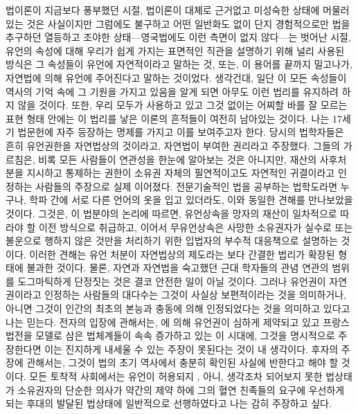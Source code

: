 법이론이 지금보다 풍부했던 시절,
법이론이 대체로 근거없고 미성숙한 상태에 머물러 있는 것은 사실이지만
그럼에도 불구하고 어떤 일반화도 없이 단지
경험적으로만 법을 추구하던 열등하고 조야한
상태---영국법에도 이런 측면이 없지 않다---는 벗어난 시절,
유언의 속성에 대해 우리가 쉽게 가지는 표면적인 직관을 설명하기 위해
널리 사용된 방식은
그 속성들이 유언에 자연적이라고 말하는 것,
또는, 이 용어를 끝까지 밀고나가,
자연법에 의해 유언에 주어진다고 말하는 것이었다.
생각건대,
일단 이 모든 속성들이
역사의 기억 속에 그 기원을 가지고 있음을 알게 되면
아무도 이런 법리를 유지하려 하지 않을 것이다.
또한,
우리 모두가 사용하고 있고
그것 없이는 어찌할 바를 잘 모르는 표현 형태 안에는
이 법리를 낳은 이론의 흔적들이
여전히 남아있는 것이다.
나는 17세기 법문헌에 자주 등장하는 명제를 가지고 이를 보여주고자 한다.
당시의 법학자들은 흔히 유언권한을 자연법상의 것이라고,
자연법이 부여한 권리라고 주장했다.
그들의 가르침은,
비록 모든 사람들이 연관성을 한눈에 알아보는 것은 아니지만,
재산의 사후처분을 지시하고 통제하는 권한이
소유권 자체의 필연적이고도 자연적인 귀결이라고
인정하는 사람들의 주장으로 실제 이어졌다.
전문기술적인 법을 공부하는 법학도라면 누구나,
학파 간에 서로 다른 언어의 옷을 입고 있더라도,
이와 동일한 견해를 만나보았을 것이다.
그것은, 이 법분야의 논리에 따르면,
%
유언상속을
망자의 재산이 일차적으로 따라야 할 이전 방식으로 취급하고,
%
이어서 무유언상속은
사망한 소유권자가 실수로 또는 불운으로
행하지 않은 것만을 처리하기 위한 입법자의 부수적 대응책으로
설명하는 것이다.
이러한 견해는 유언 처분이 자연법상의 제도라는 보다 간결한 법리가 확장된
형태에 불과한 것이다.
물론, 자연과 자연법을 숙고했던 근대 학자들의 관념 연관의 범위를
도그마틱하게 단정짓는 것은 결코 안전한 일이 아닐 것이다.
그러나 유언권이 자연권이라고 인정하는 사람들의 대다수는
그것이 사실상 보편적이라는 것을 의미하거나, 아니면
그것이 인간의 최초의 본능과 충동에 의해 인정되었다는 것을 의미하고 있다고
나는 믿는다.
전자의 입장에 관해서는,
에 의해 유언권이 심하게 제약되고 있고
프랑스 법전을 모델로 삼은 법체계들이 속속 증가하고 있는 이 시대에,
그것을 명시적으로 주장한다면
이는 진지하게 내세울 수 있는 주장이 못된다는 것이 내 생각이다.
후자의 주장에 관해서는,
그것이 법의 초기 역사에서 충분히 확인된 사실에 반한다고 해야 할 것이다.
모든 토착적 사회에서는 유언이 허용되지 ,
아니, 생각조차 되어보지 못한 법상태가
소유권자의 단순한 의사가 약간의 제약 하에
그의 혈연 친족들의 요구에 우선하게 되는 후대의 발달된 법상태에
일반적으로 선행하였다고
나는 감히 주장하고 싶다.

